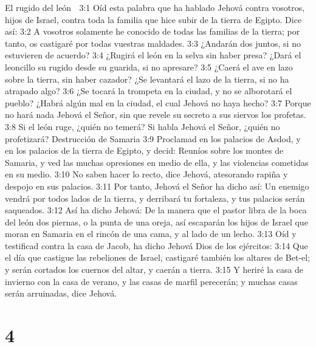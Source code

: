 El rugido del león  

3:1 Oíd esta palabra que ha hablado Jehová contra vosotros, hijos de Israel, contra toda la familia que hice subir de la tierra de Egipto. Dice así:  
3:2 A vosotros solamente he conocido de todas las familias de la tierra; por tanto, os castigaré por todas vuestras maldades.  
3:3 ¿Andarán dos juntos, si no estuvieren de acuerdo?  
3:4 ¿Rugirá el león en la selva sin haber presa? ¿Dará el leoncillo su rugido desde su guarida, si no apresare?  
3:5 ¿Caerá el ave en lazo sobre la tierra, sin haber cazador? ¿Se levantará el lazo de la tierra, si no ha atrapado algo?  
3:6 ¿Se tocará la trompeta en la ciudad, y no se alborotará el pueblo? ¿Habrá algún mal en la ciudad, el cual Jehová no haya hecho?  
3:7 Porque no hará nada Jehová el Señor, sin que revele su secreto a sus siervos los profetas.  
3:8 Si el león ruge, ¿quién no temerá? Si habla Jehová el Señor, ¿quién no profetizará?  
Destrucción de Samaria  
3:9 Proclamad en los palacios de Asdod, y en los palacios de la tierra de Egipto, y decid: Reuníos sobre los montes de Samaria, y ved las muchas opresiones en medio de ella, y las violencias cometidas en su medio.  
3:10 No saben hacer lo recto, dice Jehová, atesorando rapiña y despojo en sus palacios.  
3:11 Por tanto, Jehová el Señor ha dicho así: Un enemigo vendrá por todos lados de la tierra, y derribará tu fortaleza, y tus palacios serán saqueados.  
3:12 Así ha dicho Jehová: De la manera que el pastor libra de la boca del león dos piernas, o la punta de una oreja, así escaparán los hijos de Israel que moran en Samaria en el rincón de una cama, y al lado de un lecho.  
3:13 Oíd y testificad contra la casa de Jacob, ha dicho Jehová Dios de los ejércitos:  
3:14 Que el día que castigue las rebeliones de Israel, castigaré también los altares de Bet-el; y serán cortados los cuernos del altar, y caerán a tierra.  
3:15 Y heriré la casa de invierno con la casa de verano, y las casas de marfil perecerán; y muchas casas serán arruinadas, dice Jehová.  

\chapter{4}

